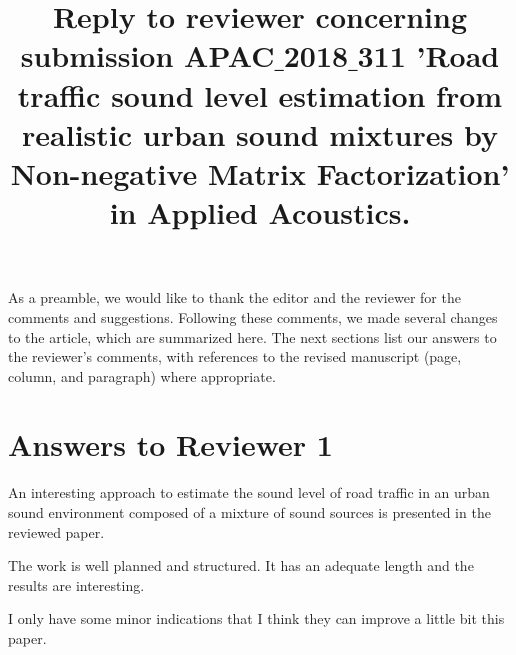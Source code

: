 \documentclass[10pt]{article}
\title{Reply to reviewer concerning submission APAC$\_$2018$\_$311 'Road traffic sound level estimation from realistic urban sound mixtures by Non-negative Matrix Factorization' in Applied Acoustics.}
\begin{document}
\maketitle

As a preamble, we would like to thank the editor and the reviewer for the comments and suggestions. Following these comments, we made several changes to the article, which are summarized here. The next sections list our answers to the reviewer’s comments, with references to the revised manuscript (page, column, and paragraph) where appropriate.

\section{Answers to Reviewer 1}

An interesting approach to estimate the sound level of road traffic in an urban sound environment composed of a mixture of sound sources is presented in the reviewed paper.

The work is well planned and structured. It has an adequate length and the results are interesting.

I only have some minor indications that I think they can improve a little bit this paper.
\end{document}
